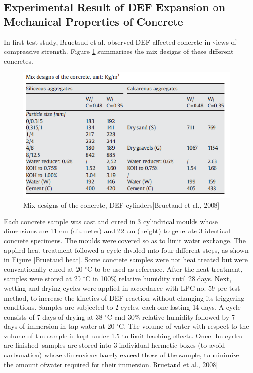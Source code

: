 \clearpage
\subsection{Experimental Result of DEF Expansion on Mechanical Properties of Concrete}

In first test study, Bruetaud et al.\cite{Bruetaud} observed DEF-affected concrete in views of compressive strength. Figure \ref{Bruetaud Mix designs} summarizes the mix designs of these different concretes.

\begin{figure}[h!]
  \centering
  \includegraphics[width=0.8\linewidth]{Reference/Bruetaud1.png}
  \caption{Mix designs of the concrete, DEF cylinders[Bruetaud et al., 2008]}
  \label{Bruetaud Mix designs}
\end{figure}

Each concrete sample was cast and cured in 3 cylindrical moulds whose dimensions are 11 cm (diameter) and 22 cm (height) to generate 3 identical concrete specimens. The moulds were covered so as to limit water exchange. The applied heat treatment followed a cycle divided into four different steps, as shown in Figure \ref{Bruetaud heat}. Some concrete samples were not heat treated but were conventionally cured at 20 $^\circ$C to be used as reference. After the heat treatment, samples were stored at 20 $^\circ$C in 100\% relative humidity until 28 days. Next, wetting and drying cycles were applied in accordance with LPC no. 59 pre-test method, to increase the kinetics of DEF reaction without changing its triggering conditions. Samples are subjected to 2 cycles, each one lasting 14 days. A cycle consists of 7 days of drying at 38 $^\circ$C and 30\% relative humidity followed by 7 days of immersion in tap water at 20 $^\circ$C. The volume of water with respect to the volume of the sample is kept under 1.5 to limit leaching effects. Once the cycles are finished, samples are stored into 3 individual hermetic boxes (to avoid carbonation) whose dimensions barely exceed those of the sample, to minimize the amount ofwater required for their immersion.[Bruetaud et al., 2008]

